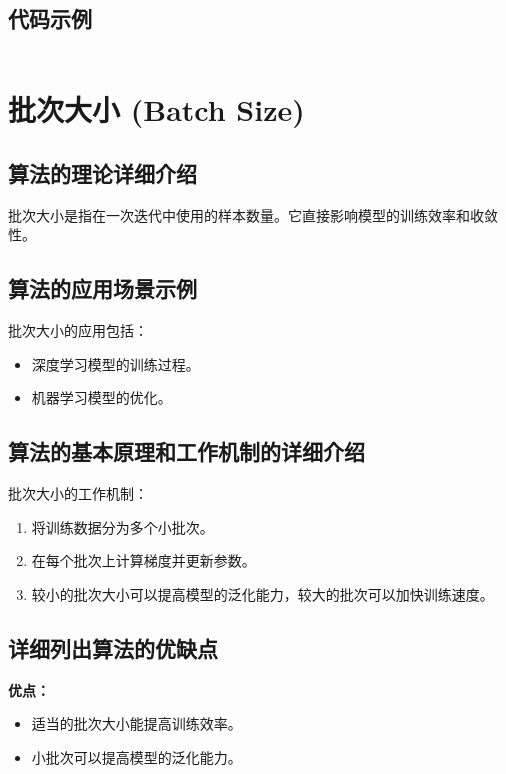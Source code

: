 \subsection*{代码示例}
\begin{lstlisting}

\end{lstlisting}


\section{批次大小 (Batch Size)}
\subsection*{算法的理论详细介绍}
批次大小是指在一次迭代中使用的样本数量。它直接影响模型的训练效率和收敛性。

\subsection*{算法的应用场景示例}
批次大小的应用包括：
\begin{itemize}
    \item 深度学习模型的训练过程。
    \item 机器学习模型的优化。
\end{itemize}

\subsection*{算法的基本原理和工作机制的详细介绍}
批次大小的工作机制：
\begin{enumerate}
    \item 将训练数据分为多个小批次。
    \item 在每个批次上计算梯度并更新参数。
    \item 较小的批次大小可以提高模型的泛化能力，较大的批次可以加快训练速度。
\end{enumerate}

\subsection*{详细列出算法的优缺点}
\textbf{优点：}
\begin{itemize}
    \item 适当的批次大小能提高训练效率。
    \item 小批次可以提高模型的泛化能力。
\end{itemize}

